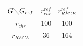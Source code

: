 \begin{table}[H]
\begin{center}
\begin{minipage}[t]{\textwidth}
\begin{tabular}{c|ccccccc}
		\end{tabular}
	\end{minipage}
\\
\vspace{0.5cm}
	\begin{minipage}[t]{\textwidth}
	\label{tablesyntbruc7}
	\centering
		\begin{tabular}{c|cc}
			$G \diagdown G_{ref}$ & $r^{ref}_{chr}$ & $r^{ref}_{RECE}$\\
			\hline
			$r_{chr}$ & 100 & 100\\
			$r_{RECE}$ & 36 & 164\\
		\end{tabular}
	\end{minipage}
\end{center}
\end{table}
 	       	       
